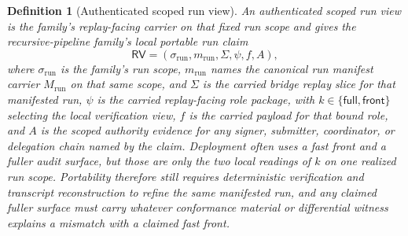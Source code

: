 \documentclass[11pt]{article}
\newtheorem{definition}{Definition}
\begin{document}
\begin{definition}[Authenticated scoped run view]
An authenticated scoped run view is the family's replay-facing carrier on that fixed run scope and gives the recursive-pipeline family's local portable run claim
\[
\mathsf{RV}=(\sigma_{\mathrm{run}},m_{\mathrm{run}},\Sigma,\psi,f,A),
\]
where $\sigma_{\mathrm{run}}$ is the family's run scope, $m_{\mathrm{run}}$ names the canonical run manifest carrier $M_{\mathrm{run}}$ on that same scope,
and $\Sigma$ is the carried bridge replay slice for that manifested run,
$\psi$ is the carried replay-facing role package, with $k\in\{\mathsf{full},\mathsf{front}\}$ selecting the local verification view,
$f$ is the carried payload for that bound role,
and $A$ is the scoped authority evidence for any signer, submitter, coordinator, or delegation chain named by the claim.
Deployment often uses a fast front and a fuller audit surface, but those are only the two local readings of $k$ on one realized run scope. Portability therefore still requires deterministic verification and transcript reconstruction to refine the same manifested run, and any claimed fuller surface must carry whatever conformance material or differential witness explains a mismatch with a claimed fast front.
\end{definition}
\end{document}
